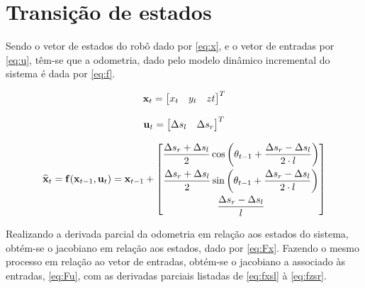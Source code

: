 \section{Transição de estados}

Sendo o vetor de estados do robô dado por \eqref{eq:x}, e o vetor de entradas por \eqref{eq:u}, têm-se que a odometria, dado pelo modelo dinâmico incremental do sistema é dada por \eqref{eq:f}.

\begin{equation}\label{eq:x}
	\mathbf{x}_t = \begin{bmatrix}
		x_t & y_t & zt
	\end{bmatrix}^T
\end{equation}


\begin{equation}\label{eq:u}
	\mathbf{u}_t = \begin{bmatrix}
		\Delta s_l & \Delta s_r
	\end{bmatrix}^T
\end{equation}

\begin{equation}\label{eq:f}
	\widehat{\mathbf{x}}_t = \mathbf{f}(\mathbf{x}_{t-1},\mathbf{u}_t) = \mathbf{x}_{t-1} + \begin{bmatrix}
		 \dfrac{\Delta s_r + \Delta s_l}{2}\cos\left(\theta_{t-1} + \dfrac{\Delta s_r - \Delta s_l}{2\cdot l}  \right) \\[2ex]
		 \dfrac{\Delta s_r + \Delta s_l}{2}\sin\left(\theta_{t-1} + \dfrac{\Delta s_r - \Delta s_l}{2\cdot l}  \right) \\[2ex]
		  \dfrac{\Delta s_r - \Delta s_l}{l}
	\end{bmatrix}
\end{equation}

Realizando a derivada parcial da odometria em relação aos estados do sistema, obtém-se o jacobiano em relação aos estados, dado por \eqref{eq:Fx}. Fazendo o mesmo processo em relação ao vetor de entradas, obtém-se o jacobiano a associado às entradas, \eqref{eq:Fu}, com as derivadas parciais listadas de \eqref{eq:fxsl} à \eqref{eq:fzsr}.


